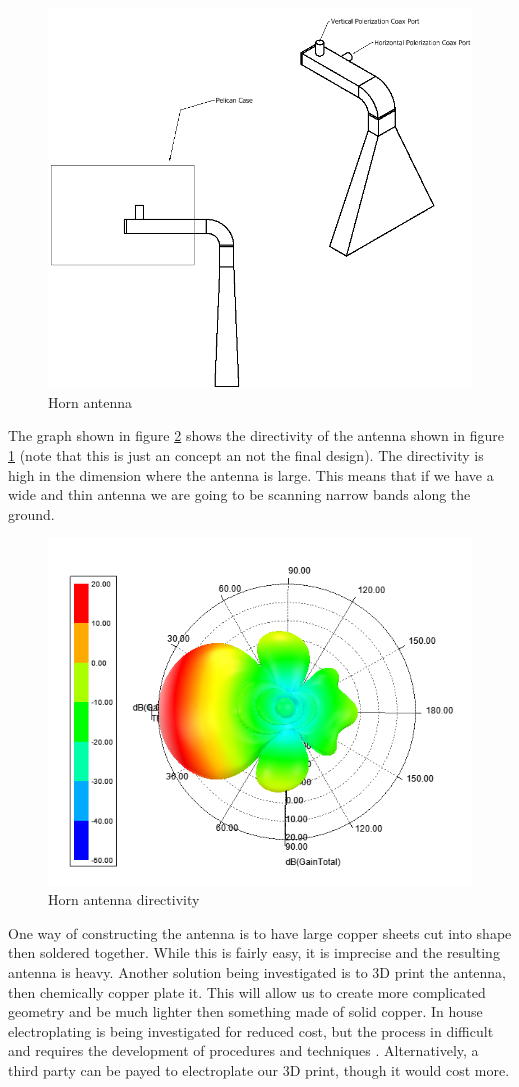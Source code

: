 \documentclass[12pt]{article}
\begin{document}
\begin{figure}
	\centering
	\includegraphics[width=0.5\linewidth]{Figures/rough_antenna.png}
	\caption{Horn antenna}
	\label{fig:antenna}
\end{figure}

The graph shown in figure \ref{fig:antenna_direction} shows the directivity of the antenna shown in figure \ref{fig:antenna} (note that this is just an concept an not the final design). The directivity is high in the dimension where the antenna is large. This means that if we have a wide and thin antenna we are going to be scanning narrow bands along the ground. 
\begin{figure}
	\centering
	\includegraphics[width=0.5\linewidth]{Figures/antenna_gain.png}
	\caption{Horn antenna directivity}
	\label{fig:antenna_direction}
\end{figure}
One way of constructing the antenna is to have large copper sheets cut into shape then soldered together. While this is fairly easy, it is imprecise and the resulting antenna is heavy. Another solution being investigated is to 3D print the antenna, then chemically copper plate it. This will allow us to create more complicated geometry and be much lighter then something made of solid copper. In house electroplating is being investigated for  reduced cost, but the process in difficult and requires the development of procedures and techniques \cite{bryancera2014}. Alternatively, a third party can be payed to electroplate our 3D print, though it would cost more.
\end{document}
